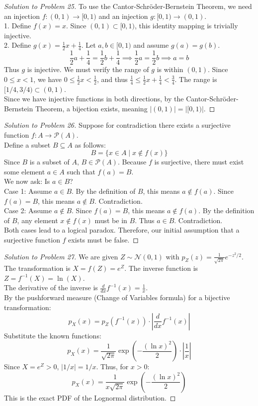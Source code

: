 \documentclass[11pt, letterpaper]{article}
\theoremstyle{definition}
\theoremstyle{remark}
\begin{document}
\begin{proof}[Solution to Problem 25]
To use the Cantor-Schröder-Bernstein Theorem, we need an injection $f : (0, 1) \to [0, 1)$ and an injection $g : [0, 1) \to (0, 1)$. \\
1. Define $f(x) = x$. Since $(0, 1) \subset [0, 1)$, this identity mapping is trivially injective. \\
2. Define $g(x) = \frac{1}{2}x + \frac{1}{4}$. Let $a, b \in [0, 1)$ and assume $g(a) = g(b)$.
\[ \frac{1}{2}a + \frac{1}{4} = \frac{1}{2}b + \frac{1}{4} \implies \frac{1}{2}a = \frac{1}{2}b \implies a = b \]
Thus $g$ is injective. We must verify the range of $g$ is within $(0, 1)$. Since $0 \le x < 1$, we have $0 \le \frac{1}{2}x < \frac{1}{2}$, and thus $\frac{1}{4} \le \frac{1}{2}x + \frac{1}{4} < \frac{3}{4}$. The range is $[1/4, 3/4) \subset (0, 1)$. \\
Since we have injective functions in both directions, by the Cantor-Schröder-Bernstein Theorem, a bijection exists, meaning $|(0, 1)| = |[0, 1)|$.
\end{proof}

\begin{proof}[Solution to Problem 26]
Suppose for contradiction there exists a surjective function $f : A \to \mathcal{P}(A)$. \\
Define a subset $B \subseteq A$ as follows:
\[ B = \{ x \in A \mid x \notin f(x) \} \]
Since $B$ is a subset of $A$, $B \in \mathcal{P}(A)$. Because $f$ is surjective, there must exist some element $a \in A$ such that $f(a) = B$. \\
We now ask: Is $a \in B$? \\
Case 1: Assume $a \in B$. By the definition of $B$, this means $a \notin f(a)$. Since $f(a) = B$, this means $a \notin B$. Contradiction. \\
Case 2: Assume $a \notin B$. Since $f(a) = B$, this means $a \notin f(a)$. By the definition of $B$, any element $x \notin f(x)$ must be in $B$. Thus $a \in B$. Contradiction. \\
Both cases lead to a logical paradox. Therefore, our initial assumption that a surjective function $f$ exists must be false.
\end{proof}

\begin{proof}[Solution to Problem 27]
We are given $Z \sim \mathcal{N}(0, 1)$ with $p_Z(z) = \frac{1}{\sqrt{2\pi}} e^{-z^2/2}$. \\
The transformation is $X = f(Z) = e^Z$. The inverse function is $Z = f^{-1}(X) = \ln(X)$. \\
The derivative of the inverse is $\frac{d}{dx} f^{-1}(x) = \frac{1}{x}$. \\
By the pushforward measure (Change of Variables formula) for a bijective transformation:
\[ p_X(x) = p_Z(f^{-1}(x)) \cdot \left| \frac{d}{dx} f^{-1}(x) \right| \]
Substitute the known functions:
\[ p_X(x) = \frac{1}{\sqrt{2\pi}} \exp\left(-\frac{(\ln x)^2}{2}\right) \cdot \left| \frac{1}{x} \right| \]
Since $X = e^Z > 0$, $|1/x| = 1/x$. Thus, for $x > 0$:
\[ p_X(x) = \frac{1}{x \sqrt{2\pi}} \exp\left(-\frac{(\ln x)^2}{2}\right) \]
This is the exact PDF of the Lognormal distribution.
\end{proof}
\end{document}
